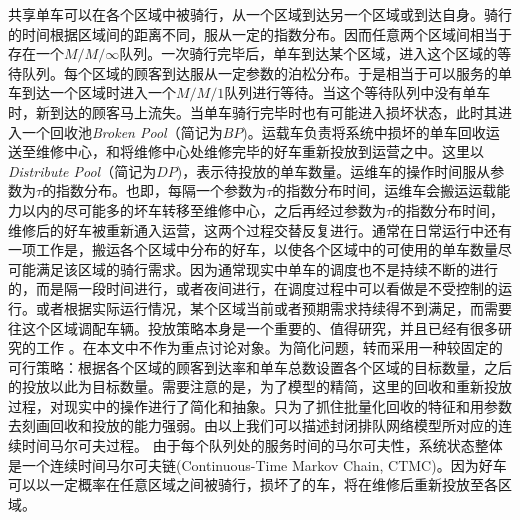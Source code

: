 \documentclass{article}
\begin{document}
共享单车可以在各个区域中被骑行，从一个区域到达另一个区域或到达自身。骑行的时间根据区域间的距离不同，服从一定的指数分布。因而任意两个区域间相当于存在一个$M/M/\infty$队列。一次骑行完毕后，单车到达某个区域，进入这个区域的等待队列。每个区域的顾客到达服从一定参数的泊松分布。于是相当于可以服务的单车到达一个区域时进入一个$M/M/1$队列进行等待。当这个等待队列中没有单车时，新到达的顾客马上流失。当单车骑行完毕时也有可能进入损坏状态，此时其进入一个回收池\textit{Broken Pool}（简记为$BP$)。运载车负责将系统中损坏的单车回收运送至维修中心，和将维修中心处维修完毕的好车重新投放到运营之中。这里以\textit{Distribute Pool}（简记为$DP$)，表示待投放的单车数量。运维车的操作时间服从参数为$\tau$的指数分布。也即，每隔一个参数为$\tau$的指数分布时间，运维车会搬运运载能力以内的尽可能多的坏车转移至维修中心，之后再经过参数为$\tau$的指数分布时间，维修后的好车被重新通入运营，这两个过程交替反复进行。通常在日常运行中还有一项工作是，搬运各个区域中分布的好车，以使各个区域中的可使用的单车数量尽可能满足该区域的骑行需求。因为通常现实中单车的调度也不是持续不断的进行的，而是隔一段时间进行，或者夜间进行，在调度过程中可以看做是不受控制的运行。或者根据实际运行情况，某个区域当前或者预期需求持续得不到满足，而需要往这个区域调配车辆。投放策略本身是一个重要的、值得研究，并且已经有很多研究的工作\cite{Caggiani2018A} \cite{温惠英2014基于迭代回归法的公共自行车投放量预测研究}。在本文中不作为重点讨论对象。为简化问题，转而采用一种较固定的可行策略：根据各个区域的顾客到达率和单车总数设置各个区域的目标数量，之后的投放以此为目标数量。需要注意的是，为了模型的精简，这里的回收和重新投放过程，对现实中的操作进行了简化和抽象。只为了抓住批量化回收的特征和用参数去刻画回收和投放的能力强弱。由以上我们可以描述封闭排队网络模型所对应的连续时间马尔可夫过程。
由于每个队列处的服务时间的马尔可夫性，系统状态整体是一个连续时间马尔可夫链(Continuous-Time Markov Chain, CTMC)。因为好车可以以一定概率在任意区域之间被骑行，损坏了的车，将在维修后重新投放至各区域。
\end{document}
